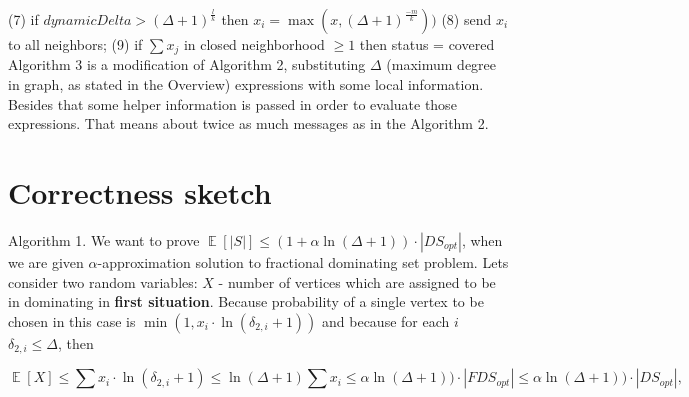 \documentclass{article}
\DeclareMathOperator{\EX}{\mathbb{E}}%
\begin{document}
\newline(7) \null\quad\quad if $dynamicDelta > (\Delta + 1)^\frac{l}{k}$ then $x_i = \max(x, (\Delta + 1)^\frac{-m}{k}))$
\newline(8) \null\quad\quad send $x_i$ to all neighbors;
\newline(9) \null\quad\quad if $\sum x_j$ in closed neighborhood $\geq 1$ then status = covered
\newline\newline Algorithm 3 is a modification of Algorithm 2, substituting $\Delta$ (maximum degree in graph, as stated in the Overview) expressions with some local information. Besides that some helper information is passed in order to evaluate those expressions. That means about twice as much messages as in the Algorithm 2.

\section{Correctness sketch}
Algorithm 1. We want to prove $\EX{[|S|]} \leq (1 + \alpha\ln(\Delta + 1)) \cdot |DS_{opt}|$, when we are given $\alpha$-approximation solution to fractional dominating set problem. Lets consider two random variables: $X$ - number of vertices which are assigned to be in dominating in \textbf{first situation}. Because probability of a single vertex to be chosen in this case 
is $\min(1, x_i \cdot \ln{(\delta_{2, i} + 1)})$ and because for each $i$ $\delta_{2,i}\leq\Delta$, then

$$
\EX{[X]} \leq \sum x_i \cdot \ln{(\delta_{2, i} + 1)} \leq \ln(\Delta + 1) \sum x_i \leq
\alpha\ln(\Delta + 1)) \cdot |FDS_{opt}| \leq \alpha\ln(\Delta + 1)) \cdot |DS_{opt}|,
$$
\end{document}

